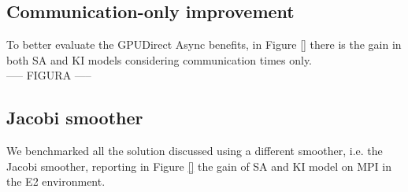 \documentclass[review]{siamart1116}
\begin{document}
\subsection{Communication-only improvement}\label{sec:comm_only}

To better evaluate the GPUDirect Async benefits, in Figure \ref{}
there is the gain in both SA and KI models considering communication times only.\\

----- FIGURA -----\\

\subsection{Jacobi smoother}\label{sec:jacobi}

We benchmarked all the solution discussed using a different smoother, i.e. the Jacobi smoother, reporting in Figure \ref{} the gain of SA and KI model on MPI in the E2 environment.



%
%

\end{document}
